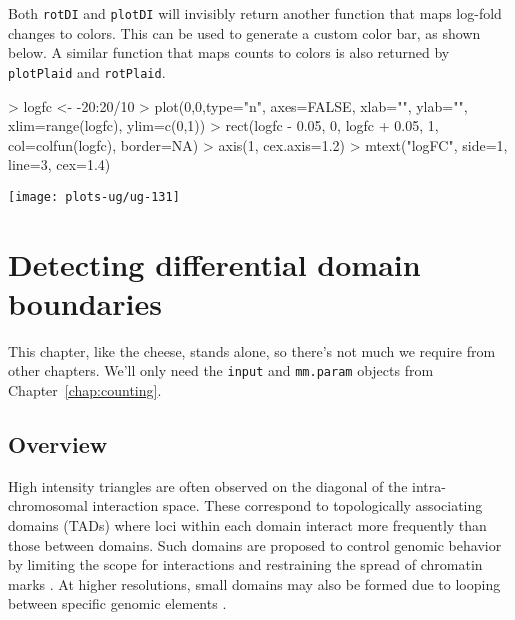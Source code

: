 \documentclass[12pt]{report}
\renewenvironment{Schunk}{\vspace{0pt}}{\vspace{0pt}}
\newcommand{\code}[1]{{\small\texttt{#1}}}
\newenvironment{combox}
{ \begin{shaded}\begin{center}\begin{minipage}[t]{0.95\textwidth} }
{ \end{minipage}\end{center}\end{shaded} }
\begin{document}
Both \code{rotDI} and \code{plotDI} will invisibly return another function that maps log-fold changes to colors.
This can be used to generate a custom color bar, as shown below.
A similar function that maps counts to colors is also returned by \code{plotPlaid} and \code{rotPlaid}.

\begin{Schunk}
\begin{Sinput}
> logfc <- -20:20/10
> plot(0,0,type="n", axes=FALSE, xlab="", ylab="", xlim=range(logfc), ylim=c(0,1))
> rect(logfc - 0.05, 0, logfc + 0.05, 1, col=colfun(logfc), border=NA)
> axis(1, cex.axis=1.2)
> mtext("logFC", side=1, line=3, cex=1.4)
\end{Sinput}
\end{Schunk}

\begin{center}
\texttt{[image: plots-ug/ug-131]}
\end{center}


\chapter{Detecting differential domain boundaries}
\label{chap:domains}
\begin{combox}
This chapter, like the cheese, stands alone, so there's not much we require from other chapters.
We'll only need the \code{input} and \code{mm.param} objects from Chapter~\ref{chap:counting}.
\end{combox}

\section{Overview}
High intensity triangles are often observed on the diagonal of the intra-chromosomal interaction space.
These correspond to topologically associating domains (TADs) where loci within each domain interact more frequently than those between domains.
Such domains are proposed to control genomic behavior by limiting the scope for interactions and restraining the spread of chromatin marks \citep{nora2013segmental}.
At higher resolutions, small domains may also be formed due to looping between specific genomic elements \citep{rao2014kilobase}.
\end{document}
